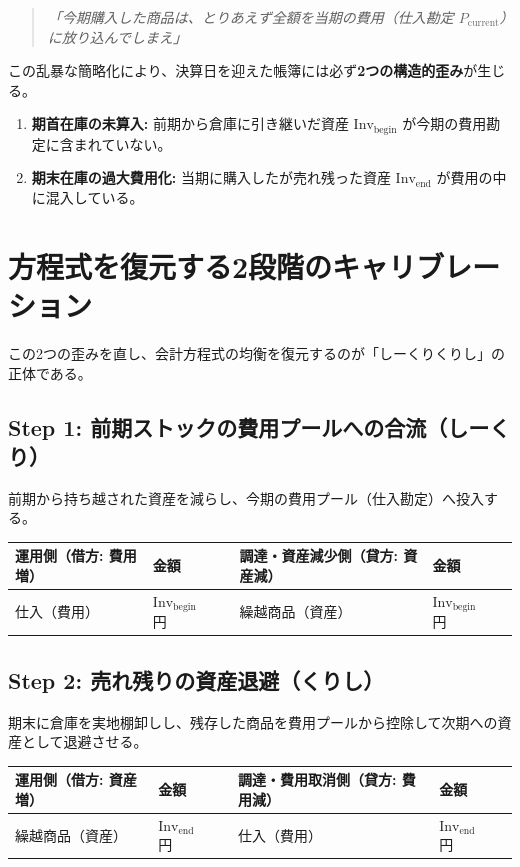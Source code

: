 \documentclass[11pt, a4paper]{report}
\begin{document}
\begin{quote}
\textit{「今期購入した商品は、とりあえず全額を当期の費用（仕入勘定 $P_{\text{current}}$）に放り込んでしまえ」}
\end{quote}

この乱暴な簡略化により、決算日を迎えた帳簿には必ず\textbf{2つの構造的歪み}が生じる。
\begin{enumerate}
    \item \textbf{期首在庫の未算入:} 前期から倉庫に引き継いだ資産 $\text{Inv}_{\text{begin}}$ が今期の費用勘定に含まれていない。
    \item \textbf{期末在庫の過大費用化:} 当期に購入したが売れ残った資産 $\text{Inv}_{\text{end}}$ が費用の中に混入している。
\end{enumerate}

\section{方程式を復元する2段階のキャリブレーション}

この2つの歪みを直し、会計方程式の均衡を復元するのが「しーくりくりし」の正体である。

\subsection{Step 1: 前期ストックの費用プールへの合流（しーくり）}
前期から持ち越された資産を減らし、今期の費用プール（仕入勘定）へ投入する。
\begin{table}[htbp]
\centering
\begin{tabular}{llrllr}
\toprule
\textbf{運用側（借方: 費用増）} & 金額 & \quad & \textbf{調達・資産減少側（貸方: 資産減）} & 金額 \\
\midrule
仕入（費用） & $\text{Inv}_{\text{begin}}$ 円 & & 繰越商品（資産） & $\text{Inv}_{\text{begin}}$ 円 \\
\bottomrule
\end{tabular}
\end{table}

\subsection{Step 2: 売れ残りの資産退避（くりし）}
期末に倉庫を実地棚卸しし、残存した商品を費用プールから控除して次期への資産として退避させる。
\begin{table}[htbp]
\centering
\begin{tabular}{llrllr}
\toprule
\textbf{運用側（借方: 資産増）} & 金額 & \quad & \textbf{調達・費用取消側（貸方: 費用減）} & 金額 \\
\midrule
繰越商品（資産） & $\text{Inv}_{\text{end}}$ 円 & & 仕入（費用） & $\text{Inv}_{\text{end}}$ 円 \\
\bottomrule
\end{tabular}
\end{table}
\end{document}

